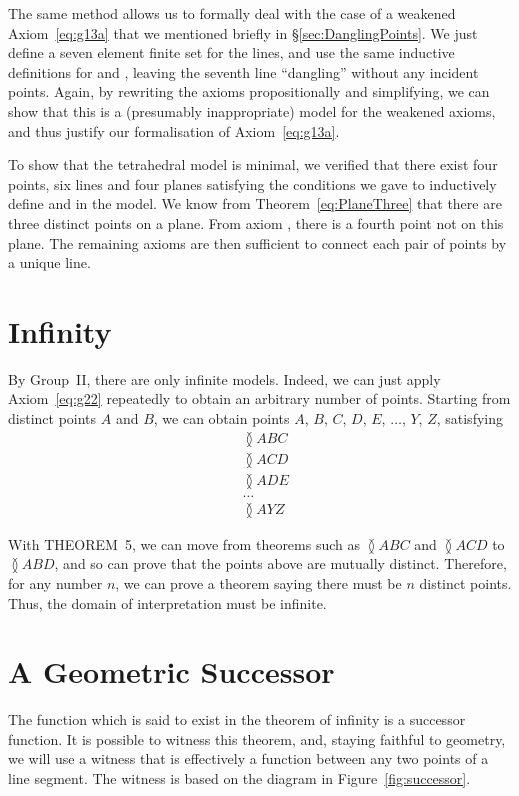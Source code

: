 The same method allows us to formally deal with the case of a weakened Axiom~\ref{eq:g13a} that we mentioned briefly in \S\ref{sec:DanglingPoints}. We just define a seven element finite set for the lines, and use the same inductive definitions for  and , leaving the seventh line ``dangling'' without any incident points. Again, by rewriting the axioms propositionally and simplifying, we can show that this is a (presumably inappropriate) model for the weakened axioms, and thus justify our formalisation of Axiom~\ref{eq:g13a}.

To show that the tetrahedral model is minimal, we verified that there exist four points, six lines and four planes satisfying the conditions we gave to inductively define  and  in the model. We know from Theorem~\ref{eq:PlaneThree} that there are three distinct points on a plane. From axiom , there is a fourth point not on this plane. The remaining axioms are then sufficient to connect each pair of points by a unique line.

\section{Infinity}\label{sec:Infinity}
By Group~II, there are only infinite models. Indeed, we can just apply Axiom~\ref{eq:g22} repeatedly to obtain an arbitrary number of points. Starting from distinct points $A$ and $B$, we can obtain points $A$, $B$, $C$, $D$, $E$, $\ldots$, $Y$, $Z$, satisfying 
\begin{align*}
&\between{A}{B}{C}\\
&\between{A}{C}{D}\\
&\between{A}{D}{E}\\
&\ldots\\
&\between{A}{Y}{Z}
\end{align*}

With THEOREM~5, we can move from theorems such as $\between{A}{B}{C}$ and $\between{A}{C}{D}$ to $\between{A}{B}{D}$, and so can prove that the points above are mutually distinct. Therefore, for any number $n$, we can prove a theorem saying there must be $n$ distinct points. Thus, the domain of interpretation must be infinite.

\section{A Geometric Successor}
The function which is said to exist in the theorem of infinity is a successor function. It is possible to  witness this theorem, and, staying faithful to geometry, we will use a witness that is effectively a function between any two points of a line segment. The witness is based on the diagram in Figure~\ref{fig:successor}.

